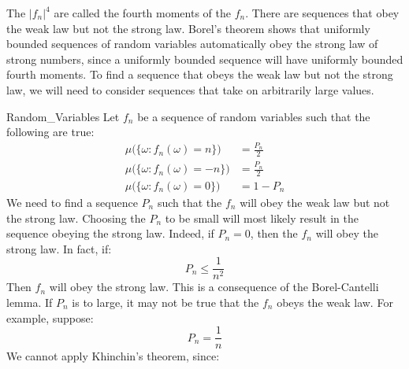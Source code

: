             The $|f_{n}|^{4}$ are called the fourth moments of the
            $f_{n}$. There are sequences that obey the weak law but
            not the strong law. Borel's theorem shows that uniformly
            bounded sequences of random variables automatically obey
            the strong law of strong numbers, since a uniformly
            bounded sequence will have uniformly bounded fourth
            moments. To find a sequence that obeys the weak law but
            not the strong law, we will need to consider sequences
            that take on arbitrarily large values.
            \begin{lexample}{}{Random_Variables}
                Let $f_{n}$ be a sequence of random variables such that
                the following are true:
                \begin{subequations}
                    \begin{align}
                        \mu\Big(\{\omega:f_{n}(\omega)=n\}\Big)
                        &=\frac{P_{n}}{2}\\
                        \mu\Big(\{\omega:f_{n}(\omega)=\minus{n}\}\Big)
                        &=\frac{P_{n}}{2}\\
                        \mu\Big(\{\omega:f_{n}(\omega)=0\}\Big)
                        &=1-P_{n}
                    \end{align}
                \end{subequations}
                We need to find a sequence $P_{n}$ such that the
                $f_{n}$ will obey the weak law but not the strong law.
                Choosing the $P_{n}$ to be small will most likely
                result in the sequence obeying the strong law. Indeed,
                if $P_{n}=0$, then the $f_{n}$ will obey the strong
                law. In fact, if:
                \begin{equation}
                    P_{n}\leq\frac{1}{n^{2}}
                \end{equation}
                Then $f_{n}$ will obey the strong law. This is a
                consequence of the Borel-Cantelli lemma. If $P_{n}$
                is to large, it may not be true that the $f_{n}$ obeys
                the weak law. For example, suppose:
                \begin{equation}
                    P_{n}=\frac{1}{n}
                \end{equation}
                We cannot apply Khinchin's theorem, since:
                \begin{equation}

\end{equation}
\end{lexample}

